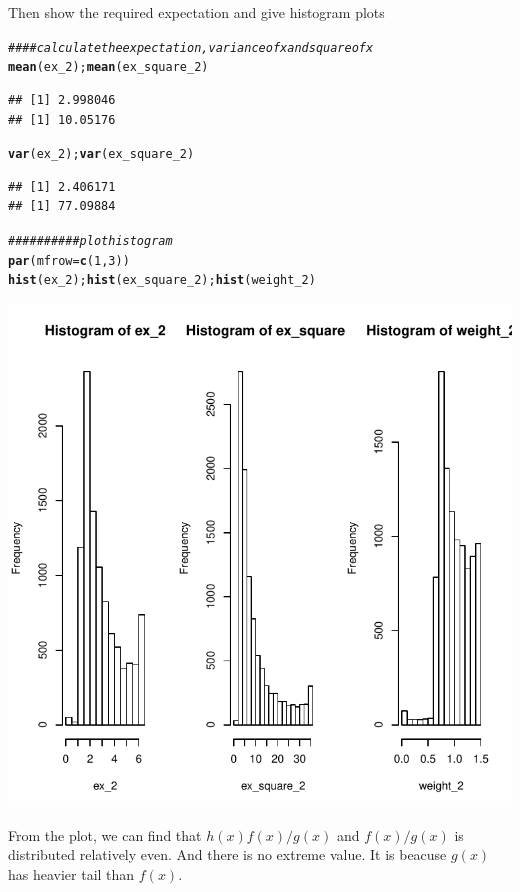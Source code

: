 \documentclass{article}\usepackage[]{graphicx}\usepackage[]{color}
\makeatletter
\def\maxwidth{ %
  \ifdim\Gin@nat@width>\linewidth
    \linewidth
  \else
    \Gin@nat@width
  \fi
}
\newcommand{\hlnum}[1]{\textcolor[rgb]{0.686,0.059,0.569}{#1}}%
\newcommand{\hlcom}[1]{\textcolor[rgb]{0.678,0.584,0.686}{\textit{#1}}}%
\newcommand{\hlstd}[1]{\textcolor[rgb]{0.345,0.345,0.345}{#1}}%
\newcommand{\hlkwc}[1]{\textcolor[rgb]{0.333,0.667,0.333}{#1}}%
\newcommand{\hlkwd}[1]{\textcolor[rgb]{0.737,0.353,0.396}{\textbf{#1}}}%
\newenvironment{kframe}{%
 \def\at@end@of@kframe{}%
 \ifinner\ifhmode%
  \def\at@end@of@kframe{\end{minipage}}%
  \begin{minipage}{\columnwidth}%
 \fi\fi%
 \def\FrameCommand##1{\hskip\@totalleftmargin \hskip-\fboxsep
 \colorbox{shadecolor}{##1}\hskip-\fboxsep
     \hskip-\linewidth \hskip-\@totalleftmargin \hskip\columnwidth}%
 \MakeFramed {\advance\hsize-\width
   \@totalleftmargin\z@ \linewidth\hsize
   \@setminipage}}%
 {\par\unskip\endMakeFramed%
 \at@end@of@kframe}
\newenvironment{knitrout}{}{} %
\makeatother
\begin{document}
Then show the required expectation and give histogram plots
\begin{knitrout}
\color{fgcolor}\begin{kframe}
\begin{alltt}
\hlcom{####calculate the expectation,variance of x and square of x}
\hlkwd{mean}\hlstd{(ex_2);}\hlkwd{mean}\hlstd{(ex_square_2)}
\end{alltt}
\begin{verbatim}
## [1] 2.998046
## [1] 10.05176
\end{verbatim}
\begin{alltt}
\hlkwd{var}\hlstd{(ex_2);}\hlkwd{var}\hlstd{(ex_square_2)}
\end{alltt}
\begin{verbatim}
## [1] 2.406171
## [1] 77.09884
\end{verbatim}
\begin{alltt}
\hlcom{##########plot histogram}
\hlkwd{par}\hlstd{(}\hlkwc{mfrow}\hlstd{=}\hlkwd{c}\hlstd{(}\hlnum{1}\hlstd{,}\hlnum{3}\hlstd{))}
\hlkwd{hist}\hlstd{(ex_2);}\hlkwd{hist}\hlstd{(ex_square_2);}\hlkwd{hist}\hlstd{(weight_2)}
\end{alltt}
\end{kframe}
\includegraphics[width=\maxwidth]{figure/r-chunk8-1} 

\end{knitrout}
From the plot, we can find that $h(x)f(x)/g(x)$ and $f(x)/g(x)$ is distributed relatively even. And there is no extreme value. It is beacuse $g(x)$ has heavier tail than $f(x)$.
\end{document}
